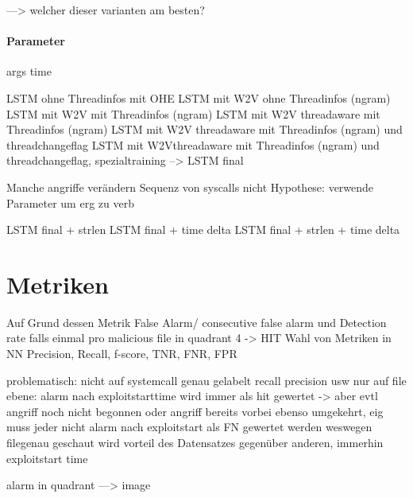                 ---> welcher dieser varianten am besten?

            \paragraph{Parameter}
                args
                time

                LSTM ohne Threadinfos mit OHE
                LSTM mit W2V ohne Threadinfos (ngram)
                LSTM mit W2V mit Threadinfos (ngram)
                LSTM mit W2V threadaware mit Threadinfos (ngram)
                LSTM mit W2V threadaware mit Threadinfos (ngram) und threadchangeflag
                LSTM mit W2Vthreadaware mit Threadinfos (ngram) und threadchangeflag, spezialtraining
                --> LSTM final

                Manche angriffe verändern Sequenz von syscalls nicht
                Hypothese:
                verwende Parameter um erg zu verb

                LSTM final + strlen
                LSTM final + time delta
                LSTM final + strlen + time delta

    \section{Metriken}\label{sec:Metriken}
        Auf Grund dessen Metrik False Alarm/ consecutive false alarm und Detection rate falls einmal pro malicious file in quadrant 4 -> HIT
        Wahl von Metriken in NN
        Precision, Recall, f-score, TNR, FNR, FPR

        problematisch:
        nicht auf systemcall genau gelabelt
        recall precision usw nur auf file ebene:
        alarm nach exploitstarttime wird immer als hit gewertet -> aber evtl angriff noch nicht begonnen
        oder angriff bereits vorbei
        ebenso umgekehrt, eig muss jeder nicht alarm nach exploitstart als FN gewertet werden
        weswegen filegenau geschaut wird
        vorteil des Datensatzes gegenüber anderen, immerhin exploitstart time

        alarm in quadrant ---> image




